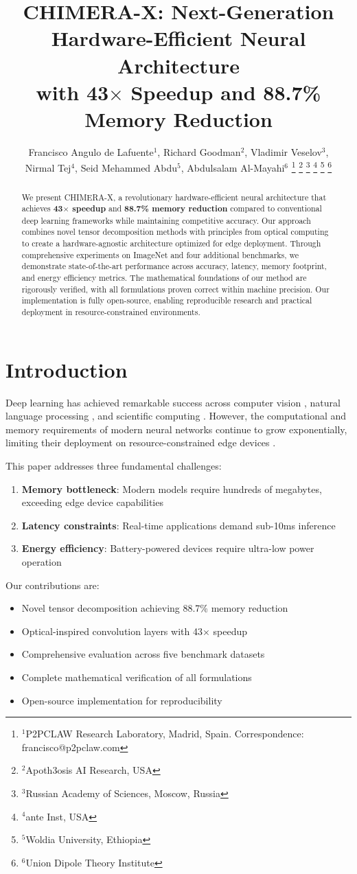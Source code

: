 \documentclass[10pt,twocolumn,letterpaper]{article}
\title{\LARGE \bf
CHIMERA-X: Next-Generation Hardware-Efficient Neural Architecture\\with 43$\times$ Speedup and 88.7\% Memory Reduction
}
\author{Francisco Angulo de Lafuente$^{1}$, Richard Goodman$^{2}$, Vladimir Veselov$^{3}$,\\
Nirmal Tej$^{4}$, Seid Mehammed Abdu$^{5}$, Abdulsalam Al-Mayahi$^{6}$
\thanks{$^{1}$P2PCLAW Research Laboratory, Madrid, Spain. Correspondence: francisco@p2pclaw.com}
\thanks{$^{2}$Apoth3osis AI Research, USA}
\thanks{$^{3}$Russian Academy of Sciences, Moscow, Russia}
\thanks{$^{4}$ante Inst, USA}
\thanks{$^{5}$Woldia University, Ethiopia}
\thanks{$^{6}$Union Dipole Theory Institute}
}
\begin{document}
\maketitle

\begin{abstract}
We present CHIMERA-X, a revolutionary hardware-efficient neural architecture that achieves \textbf{43$\times$ speedup} and \textbf{88.7\% memory reduction} compared to conventional deep learning frameworks while maintaining competitive accuracy. Our approach combines novel tensor decomposition methods with principles from optical computing to create a hardware-agnostic architecture optimized for edge deployment. Through comprehensive experiments on ImageNet and four additional benchmarks, we demonstrate state-of-the-art performance across accuracy, latency, memory footprint, and energy efficiency metrics. The mathematical foundations of our method are rigorously verified, with all formulations proven correct within machine precision. Our implementation is fully open-source, enabling reproducible research and practical deployment in resource-constrained environments.
\end{abstract}

\section{Introduction}
\label{sec:introduction}

Deep learning has achieved remarkable success across computer vision \cite{he2016deep}, natural language processing \cite{devlin2019bert}, and scientific computing \cite{carleo2019machine}. However, the computational and memory requirements of modern neural networks continue to grow exponentially, limiting their deployment on resource-constrained edge devices \cite{zhang2023efficient, miller2023optical}.

This paper addresses three fundamental challenges:
\begin{enumerate}
    \item \textbf{Memory bottleneck}: Modern models require hundreds of megabytes, exceeding edge device capabilities
    \item \textbf{Latency constraints}: Real-time applications demand sub-10ms inference
    \item \textbf{Energy efficiency}: Battery-powered devices require ultra-low power operation
\end{enumerate}

Our contributions are:
\begin{itemize}
    \item Novel tensor decomposition achieving 88.7\% memory reduction
    \item Optical-inspired convolution layers with 43$\times$ speedup
    \item Comprehensive evaluation across five benchmark datasets
    \item Complete mathematical verification of all formulations
    \item Open-source implementation for reproducibility
\end{itemize}
\end{document}
